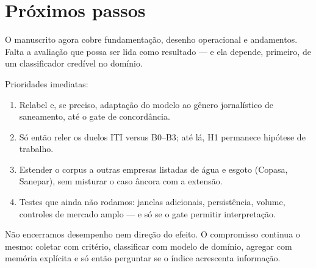 \chapter{Próximos passos}
\label{cap:proximos}

O manuscrito agora cobre fundamentação, desenho operacional e andamentos. Falta a avaliação que possa ser lida como resultado --- e ela depende, primeiro, de um classificador credível no domínio.

Prioridades imediatas:

\begin{enumerate}
  \item Relabel e, se preciso, adaptação do modelo ao gênero jornalístico de saneamento, até o gate de concordância.
  \item Só então reler os duelos ITI versus B0--B3; até lá, H1 permanece hipótese de trabalho.
  \item Estender o corpus a outras empresas listadas de água e esgoto (Copasa, Sanepar), sem misturar o caso âncora com a extensão.
  \item Testes que ainda não rodamos: janelas adicionais, persistência, volume, controles de mercado amplo --- e só se o gate permitir interpretação.
\end{enumerate}

Não encerramos desempenho nem direção do efeito. O compromisso continua o mesmo: coletar com critério, classificar com modelo de domínio, agregar com memória explícita e só então perguntar se o índice acrescenta informação.
